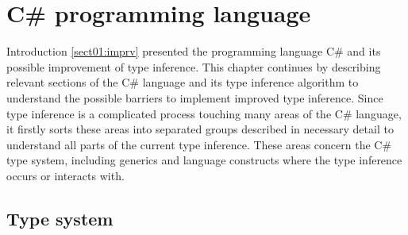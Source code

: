 \chapter{C\# programming language}

Introduction \ref{sect01:imprv} presented the programming language C\# and its possible improvement of type inference. 
This chapter continues by describing relevant sections of the C\# language and its type inference algorithm to understand the possible barriers to implement improved type inference. 
Since type inference is a complicated process touching many areas of the C\# language, it firstly sorts these areas into separated groups described in necessary detail to understand all parts of the current type inference. 
These areas concern the C\# type system, including generics and language constructs where the type inference occurs or interacts with.

\section{Type system}


